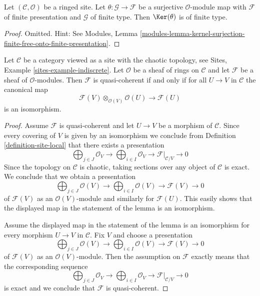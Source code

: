 \begin{lemma}
\label{lemma-kernel-surjection-finite-onto-finite-presentation}
Let $(\mathcal{C}, \mathcal{O})$ be a ringed site.
Let $\theta : \mathcal{G} \to \mathcal{F}$ be a surjective
$\mathcal{O}$-module map with $\mathcal{F}$ of finite presentation
and $\mathcal{G}$ of finite type. Then $\Ker(\theta)$ is of finite type.
\end{lemma}

\begin{proof}
Omitted. Hint: See Modules, Lemma
\ref{modules-lemma-kernel-surjection-finite-free-onto-finite-presentation}.
\end{proof}

\begin{lemma}
\label{lemma-chaotic-quasi-coherent}
Let $\mathcal{C}$ be a category viewed as a site with the chaotic
topology, see Sites, Example \ref{sites-example-indiscrete}. Let $\mathcal{O}$
be a sheaf of rings on $\mathcal{C}$ and let $\mathcal{F}$ be a sheaf
of $\mathcal{O}$-modules. Then $\mathcal{F}$ is quasi-coherent if
and only if for all $U \to V$ in $\mathcal{C}$ the canonical map
$$
\mathcal{F}(V) \otimes_{\mathcal{O}(V)} \mathcal{O}(U)
\longrightarrow
\mathcal{F}(U)
$$
is an isomorphism.
\end{lemma}

\begin{proof}
Assume $\mathcal{F}$ is quasi-coherent and let $U \to V$ be a morphism
of $\mathcal{C}$. Since every covering of $V$ is given by an isomorphism
we conclude from Definition \ref{definition-site-local}
that there exists a presentation
$$
\bigoplus\nolimits_{j \in J} \mathcal{O}_V \longrightarrow
\bigoplus\nolimits_{i \in I} \mathcal{O}_V \longrightarrow
\mathcal{F}|_{\mathcal{C}/V} \longrightarrow 0
$$
Since the topology on $\mathcal{C}$ is chaotic, taking sections over
any object of $\mathcal{C}$ is exact. We conclude that we obtain
a presentation
$$
\bigoplus\nolimits_{j \in J} \mathcal{O}(V) \longrightarrow
\bigoplus\nolimits_{i \in I} \mathcal{O}(V) \longrightarrow
\mathcal{F}(V) \longrightarrow 0
$$
of $\mathcal{F}(V)$ as an $\mathcal{O}(V)$-module and similarly for
$\mathcal{F}(U)$. This easily shows that the displayed map in the statement
of the lemma is an isomorphism.

\medskip\noindent
Assume the displayed map in the statement of the lemma is an isomorphism
for every morphism $U \to V$ in $\mathcal{C}$. Fix $V$ and choose a
presentation
$$
\bigoplus\nolimits_{j \in J} \mathcal{O}(V) \longrightarrow
\bigoplus\nolimits_{i \in I} \mathcal{O}(V) \longrightarrow
\mathcal{F}(V) \longrightarrow 0
$$
of $\mathcal{F}(V)$ as an $\mathcal{O}(V)$-module. Then the assumption
on $\mathcal{F}$ exactly means that the corresponding sequence
$$
\bigoplus\nolimits_{j \in J} \mathcal{O}_V \longrightarrow
\bigoplus\nolimits_{i \in I} \mathcal{O}_V \longrightarrow
\mathcal{F}|_{\mathcal{C}/V} \longrightarrow 0
$$
is exact and we conclude that $\mathcal{F}$ is quasi-coherent.
\end{proof}

